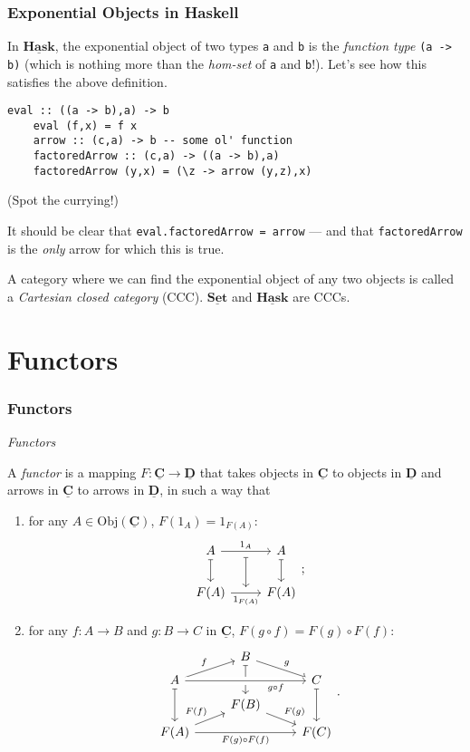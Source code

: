 \documentclass[10pt]{beamer}
\newcommand{\Cat}[1]{\ensuremath{\underline{\mathbf{#1}}}}
\newcommand{\Obj}[1]{\ensuremath{\mathrm{Obj}(\Cat{#1})}}
\theoremstyle{definition}
\theoremstyle{remark}
\numberwithin{equation}{section}
\begin{document}
\begin{frame}
  \frametitle{Exponential Objects in Haskell}

  In $\Cat{Hask}$, the exponential object of two types \lstinline{a} and
  \lstinline{b} is the \emph{function type} \lstinline{(a -> b)} (which is
  nothing more than the \emph{hom-set} of \lstinline{a} and \lstinline{b}!). Let's see
  how this satisfies the above definition.

  \begin{lstlisting}[frame=single]
    eval :: ((a -> b),a) -> b
    eval (f,x) = f x
    arrow :: (c,a) -> b -- some ol' function
    factoredArrow :: (c,a) -> ((a -> b),a)
    factoredArrow (y,x) = (\z -> arrow (y,z),x)
  \end{lstlisting}
  {\footnotesize{(Spot the currying!)}}

  It should be clear that \lstinline{eval.factoredArrow = arrow} --- and that
  \lstinline{factoredArrow} is the \emph{only} arrow for which this is true.

  A category where we can find the exponential object of any two objects is
  called a \emph{Cartesian closed category} (CCC). $\Cat{Set}$ and $\Cat{Hask}$
  are CCCs.
\end{frame}

\section{Functors}

\begin{frame}[fragile]
  \frametitle{Functors}

  \emph{Functors}

  A \emph{functor} is a mapping $F\colon \Cat{C} \rightarrow \Cat{D}$ that takes objects in
  $\Cat{C}$ to objects in $\Cat{D}$ and arrows in $\Cat{C}$ to arrows in
  $\Cat{D}$, in such a way that
  \begin{enumerate}
  \item for any $A \in \Obj{C}$, $F(1_A) = 1_{F(A)}$:
    \[
      \begin{tikzcd}
        A \arrow[mapsto]{d} \arrow[""' name = id]{r}{1_A} & A \arrow[mapsto]{d} \\
        F(A) \arrow[swap,""' name = Fid]{r}{1_{F(A)}} & F(A) \arrow[mapsto,from=id,to=Fid]
      \end{tikzcd}\rlap{;}
    \]
  \item for any $f\colon A \rightarrow B$ and $g\colon B \rightarrow C$ in $\Cat{C}$, $F(g \circ f) =
    F(g) \circ F(f)$:
    \[
      \begin{tikzcd}[row sep=tiny]
        & B \arrow[mapsto]{dd} \arrow{dr}{g} & \\
        A \arrow[mapsto]{dd} \arrow{ur}{f} \arrow[crossing over,swap,near end]{rr}{g \circ f} & & C \arrow[mapsto]{dd} \\
        & F(B) \arrow{dr}{F(g)} & \\
        F(A) \arrow{ur}{F(f)} \arrow[swap]{rr}{F(g) \circ F(f)} & & F(C)
      \end{tikzcd}\rlap{.}
    \]
  \end{enumerate}
\end{frame}
\end{document}
